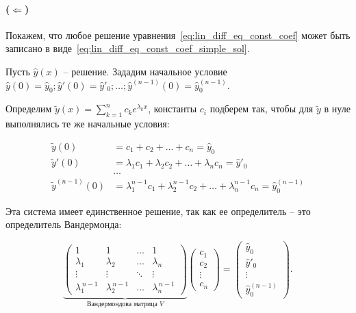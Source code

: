 \paragraph{($\Leftarrow$)} Покажем, что любое решение уравнения~\ref{eq:lin_diff_eq_const_coef} может быть записано в виде~\ref{eq:lin_diff_eq_const_coef_simple_sol}.

Пусть $\hat{y}(x)$ -- решение. Зададим начальное условие $\hat{y}(0) = \hat{y}_0; \hat{y}'(0) = \hat{y}'_0; \dots; \hat{y}^{(n-1)}(0) = \hat{y}^{(n-1)}_0$.

Определим $\tilde{y}(x) = \sum_{k=1}^n c_k e^{\lambda_k x}$, константы $c_i$ подберем так, чтобы для $\tilde{y}$ в нуле выполнялись те же начальные условия:

\begin{align*}
    \tilde{y}(0) &= c_1 + c_2 + \dots + c_n = \hat{y}_0 \\
    \tilde{y}'(0) &= \lambda_1 c_1 + \lambda_2 c_2 + \dots + \lambda_n c_n = \hat{y}'_0 \\
    &\dots \\
    \tilde{y}^{(n-1)}(0) &= \lambda_1^{n-1} c_1 + \lambda_2^{n-1} c_2 + \dots + \lambda_n^{n-1} c_n = \hat{y}^{(n-1)}_0
\end{align*}

Эта система имеет единственное решение, так как ее определитель -- это определитель Вандермонда:

\begin{equation*}
    \underbrace{
        \begin{pmatrix}
            1 & 1 & \dots & 1 \\
            \lambda_1 & \lambda_2 & \dots & \lambda_n \\
            \vdots & \vdots & \ddots & \vdots \\
            \lambda_1^{\,n-1} & \lambda_2^{\,n-1} & \dots & \lambda_n^{\,n-1}
        \end{pmatrix}}_{\text{Вандермондова матрица } V}
    \begin{pmatrix}
        c_1 \\ c_2 \\ \vdots \\ c_n
    \end{pmatrix}
    =
    \begin{pmatrix}
        \hat{y}_0 \\ \hat{y}'_0 \\ \vdots \\ \hat{y}^{(n-1)}_0
    \end{pmatrix}.
\end{equation*}

